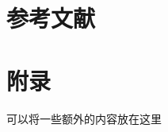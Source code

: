 \documentclass{article}
\theoremstyle{plain}
\theoremstyle{definition}
\theoremstyle{remark}
\begin{document}
\section{参考文献}




\newpage
\appendix
\onecolumn
\section{附录}

可以将一些额外的内容放在这里
\end{document}
